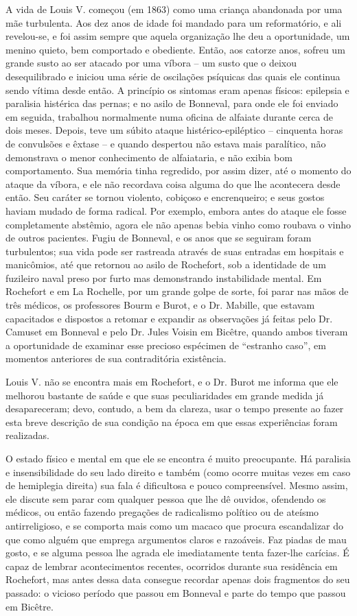 A vida de Louis V. começou (em 1863) como uma criança abandonada por uma
mãe turbulenta.  Aos dez anos de idade foi mandado para um
reformatório, e ali revelou-se, e foi assim sempre que aquela
organização lhe deu a oportunidade, um menino quieto, bem comportado e
obediente.  Então, aos catorze anos, sofreu um grande susto ao ser
atacado por uma víbora -- um susto que o deixou desequilibrado e iniciou
uma série de oscilações psíquicas das quais ele continua sendo vítima
desde então.  A princípio os sintomas eram apenas físicos: epilepsia e
paralisia histérica das pernas; e no asilo de Bonneval, para onde ele
foi enviado em seguida, trabalhou normalmente numa oficina de alfaiate
durante cerca de dois meses.  Depois, teve um súbito ataque
histérico-epiléptico -- cinquenta horas de convulsões e êxtase -- e
quando despertou não estava mais paralítico, não demonstrava o menor
conhecimento de alfaiataria, e não exibia bom comportamento.  Sua
memória tinha regredido, por assim dizer, até o momento do ataque da
víbora, e ele não recordava coisa alguma do que lhe acontecera desde
então.  Seu caráter se tornou violento, cobiçoso e encrenqueiro; e
seus gostos haviam mudado de forma radical.  Por exemplo, embora antes
do ataque ele fosse completamente abstêmio, agora ele não apenas bebia
vinho como roubava o vinho de outros pacientes.  Fugiu de Bonneval, e
os anos que se seguiram foram turbulentos; sua vida pode ser rastreada
através de suas entradas em hospitais e manicômios, até que retornou
ao asilo de Rochefort, sob a identidade de um fuzileiro naval preso por
furto mas demonstrando instabilidade mental. Em Rochefort e em La
Rochelle, por um grande golpe de sorte, foi parar nas mãos de três
médicos, os professores Bourm e Burot, e o Dr. Mabille, que estavam
capacitados e dispostos a retomar e expandir as observações já feitas
pelo Dr. Camuset em Bonneval e pelo Dr. Jules Voisin em Bicêtre, quando
ambos tiveram a oportunidade de examinar esse precioso espécimen de
“estranho caso”, em momentos anteriores de sua contraditória
existência.

Louis V. não se encontra mais em Rochefort, e o Dr. Burot me informa que
ele melhorou bastante de saúde e que suas peculiaridades em grande
medida já desapareceram; devo, contudo, a bem da clareza, usar o tempo
presente ao fazer esta breve descrição de sua condição na época em que
essas experiências foram realizadas.

O estado físico e mental em que ele se encontra é muito preocupante. Há
paralisia e insensibilidade do seu lado direito e também (como ocorre
muitas vezes em caso de hemiplegia direita) sua fala é dificultosa e
pouco compreensível.  Mesmo assim, ele discute sem parar com qualquer
pessoa que lhe dê ouvidos, ofendendo os médicos, ou então fazendo
pregações de radicalismo político ou de ateísmo antirreligioso, e se
comporta mais como um macaco que procura escandalizar do que como
alguém que emprega argumentos claros e razoáveis. Faz piadas de mau
gosto, e se alguma pessoa lhe agrada ele imediatamente tenta fazer-lhe
carícias.  É capaz de lembrar acontecimentos recentes, ocorridos
durante sua residência em Rochefort, mas antes dessa data consegue
recordar apenas dois fragmentos do seu passado: o vicioso período que
passou em Bonneval e parte do tempo que passou em Bicêtre.

